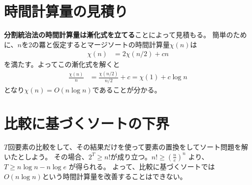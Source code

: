\documentclass[a4paper,twoside,onecolumn,openany,article,10pt]{memoir}
\theoremstyle{remark}
\begin{document}
\section{時間計算量の見積り}
\textbf{分割統治法の時間計算量は漸化式を立てる}ことによって見積もる。
簡単のために、$n$を2の羃と仮定するとマージソートの時間計算量$\chi(n)$は
\begin{align*}
\chi(n) &= 2 \chi(n/2) + c n
\end{align*}
を満たす。よってこの漸化式を解くと
\begin{align*}
\frac{\chi(n)}n &= \frac{\chi(n/2)}{n/2} + c = \chi(1) + c \log n
\end{align*}
となり$\chi(n) = O(n\log n)$であることが分かる。


\section{比較に基づくソートの下界}
$T$回要素の比較をして、その結果だけを使って要素の置換をしてソート問題を解いたとしよう。
その場合、$2^T \ge n!$が成り立つ。$n! \ge \left(\frac{n}{e}\right)^n$ より、$T\ge n\log n - n \log e$ が得られる。
よって、比較に基づくソートでは$O(n\log n)$という時間計算量を改善することはできない。
\end{document}
